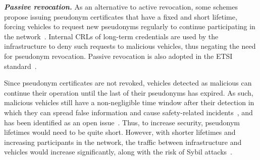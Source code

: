 \noindent\textbf{\emph{Passive revocation.}}
%
As an alternative to active revocation, some schemes propose issuing pseudonym
certificates that have a fixed and short lifetime, forcing vehicles to request
new pseudonyms regularly to continue participating in the
network~\cite{hicks2020vehicular,verheul2019ifal,ahmed2017secure}. Internal
\acp{CRL} of long-term credentials are used by the infrastructure to deny such
requests to malicious vehicles, thus negating the need for pseudonym revocation.
Passive revocation is also adopted in the ETSI standard~\cite{etsi2022102941}.

Since pseudonym certificates are not revoked, vehicles detected as malicious can
continue their operation until the last of their pseudonyms has expired. As
such, malicious vehicles still have a non-negligible time window after their
detection in which they can spread false information and cause safety-related
incidents~\cite{etsi2018tr04103415}, and has been identified as an open
issue~\cite{yoshizawa2022v2x_survey}. Thus, to increase security, pseudonym
lifetimes would need to be quite short. However, with shorter lifetimes and
increasing participants in the network, the traffic between infrastructure and
vehicles would increase significantly, along with the risk of Sybil
attacks~\cite{douceur2002sybil}.
%
%
%


